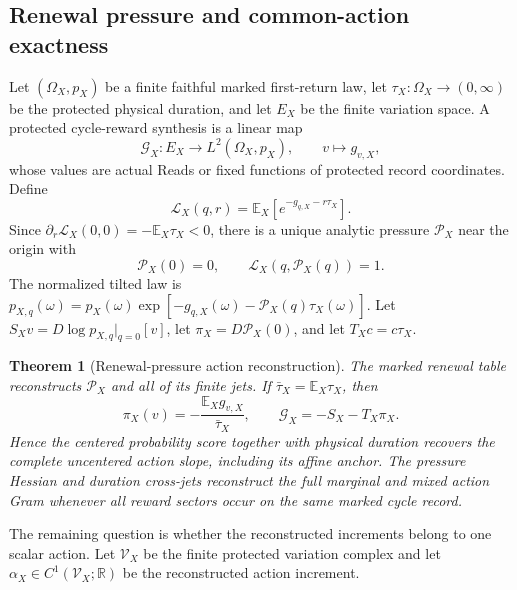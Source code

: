 \documentclass[11pt]{article}
\newtheorem{theorem}{Theorem}[section]
\numberwithin{equation}{section}
\theoremstyle{definition}
\theoremstyle{remark}
\newcommand{\R}{\mathbb R}
\begin{document}
\subsection{Renewal pressure and common-action exactness}

Let $(\Omega_X,p_X)$ be a finite faithful marked first-return law, let
$\tau_X:\Omega_X\to(0,\infty)$ be the protected physical duration, and let
$E_X$ be the finite variation space.  A protected cycle-reward synthesis is a
linear map
\begin{equation}
 \mathscr G_X:E_X\longrightarrow L^2(\Omega_X,p_X),
 \qquad v\longmapsto g_{v,X},
 \label{eq:main-reward-synthesis}
\end{equation}
whose values are actual Reads or fixed functions of protected record
coordinates.  Define
\begin{equation}
 \mathcal L_X(q,r)
 =\mathbb E_X\!\left[e^{-g_{q,X}-r\tau_X}\right].
 \label{eq:main-reward-laplace}
\end{equation}
Since $\partial_r\mathcal L_X(0,0)=-\mathbb E_X\tau_X<0$, there is a unique
analytic pressure $\mathcal P_X$ near the origin with
\begin{equation}
 \mathcal P_X(0)=0,\qquad
 \mathcal L_X(q,\mathcal P_X(q))=1.
 \label{eq:main-renewal-pressure}
\end{equation}
The normalized tilted law is
$p_{X,q}(\omega)=p_X(\omega)
\exp[-g_{q,X}(\omega)-\mathcal P_X(q)\tau_X(\omega)]$.
Let $S_Xv=D\log p_{X,q}|_{q=0}[v]$, let
$\pi_X=D\mathcal P_X(0)$, and let $T_Xc=c\tau_X$.

\begin{theorem}[Renewal-pressure action reconstruction]
\label{thm:main-action-reconstruction}
The marked renewal table reconstructs $\mathcal P_X$ and all of its finite
jets.  If $\bar\tau_X=\mathbb E_X\tau_X$, then
\begin{equation}
 \pi_X(v)=-\frac{\mathbb E_X g_{v,X}}{\bar\tau_X},
 \qquad
 \mathscr G_X=-S_X-T_X\pi_X.
 \label{eq:main-action-slope-reconstruction}
\end{equation}
Hence the centered probability score together with physical duration recovers
the complete uncentered action slope, including its affine anchor.  The pressure
Hessian and duration cross-jets reconstruct the full marginal and mixed action
Gram whenever all reward sectors occur on the same marked cycle record.
\end{theorem}

The remaining question is whether the reconstructed increments belong to one
scalar action.  Let $\mathscr V_X$ be the finite protected variation complex and
let $\alpha_X\in C^1(\mathscr V_X;\R)$ be the reconstructed action increment.
\end{document}
